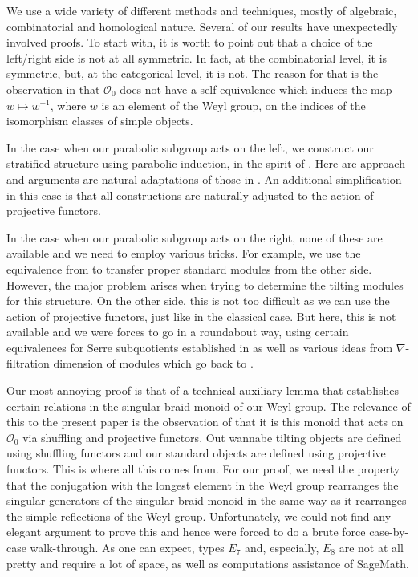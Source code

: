 \documentclass[a4paper]{amsart}
\begin{document}
We use a wide variety of different methods and techniques, mostly of algebraic,
combinatorial and homological nature. Several of our results have
unexpectedly involved proofs. To start with, it is worth to point
out that a choice of the left/right side is not at all symmetric.
In fact, at the combinatorial level, it is symmetric, but, at the
categorical level, it is not. The reason for that is the observation
in \cite[Remark~1.2]{MS2} that $\mathcal{O}_0$ does not have a self-equivalence
which induces the map $w\mapsto w^{-1}$, where $w$ is an element of
the Weyl group, on the indices of the isomorphism classes of simple
objects.

In the case when our parabolic subgroup acts on the left, we 
construct our stratified structure using parabolic induction,
in the spirit of \cite{FKM}. Here are approach and arguments are
natural adaptations of those in \cite{FKM}. An additional 
simplification in this case is that all constructions are naturally
adjusted to the action of projective functors.

In the case when our parabolic subgroup acts on the right, none of 
these are available and we need to employ various tricks. For example,
we use the equivalence from \cite{So86} to transfer 
proper standard modules from the other side. However, the major 
problem arises when trying to determine the tilting modules for
this structure. On the other side, this is not too difficult as
we can use the action of projective functors, just like in the 
classical case. But here, this is not available and we were forces to
go in a roundabout way, using certain equivalences for Serre 
subquotients established in \cite{CMZ} as well as various ideas
from $\nabla$-filtration dimension of modules which go back to
\cite{Pa,MO}.

Our most annoying proof is that of a technical auxiliary lemma 
that establishes certain relations in the singular braid monoid
of our Weyl group. The relevance of this to the present paper 
is the observation of \cite{MS2,J-Z} that it is this monoid
that acts on $\mathcal{O}_0$ via shuffling and projective functors.
Out wannabe tilting objects are defined using shuffling functors
and our standard objects are defined using projective functors.
This is where all this comes from. For our proof, we need the 
property that the conjugation with the longest element in the 
Weyl group rearranges the singular generators of
the singular braid monoid in the same way
as it rearranges the simple reflections of the Weyl group. 
Unfortunately, we could not find any elegant argument to prove this
and hence were forced to do a brute force case-by-case walk-through.
As one can expect, types $E_7$ and, especially, $E_8$ are not at all pretty
and require a lot of space, as well as computations assistance of 
SageMath.
\end{document}
